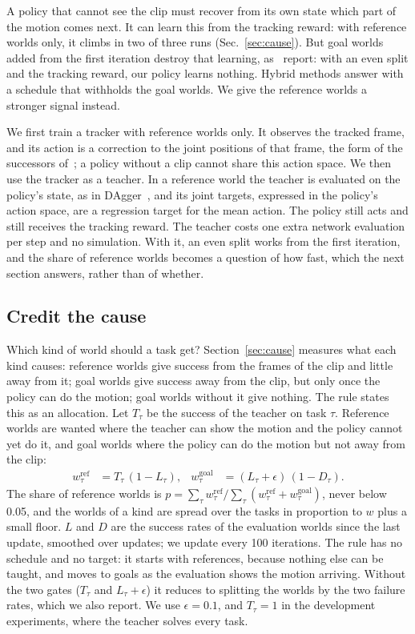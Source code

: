 A policy that cannot see the clip must recover from its own state which part of the motion comes next. It can learn this from the tracking reward: with reference worlds only, it climbs in two of three runs (Sec.~\ref{sec:cause}). But goal worlds added from the first iteration destroy that learning, as~\cite{wang2026generalizing} report: with an even split and the tracking reward, our policy learns nothing. Hybrid methods answer with a schedule that withholds the goal worlds. We give the reference worlds a stronger signal instead.

We first train a tracker with reference worlds only. It observes the tracked frame, and its action is a correction to the joint positions of that frame, the form of the successors of~\cite{deepmimic}; a policy without a clip cannot share this action space. We then use the tracker as a teacher. In a reference world the teacher is evaluated on the policy's state, as in DAgger~\cite{dagger}, and its joint targets, expressed in the policy's action space, are a regression target for the mean action. The policy still acts and still receives the tracking reward. The teacher costs one extra network evaluation per step and no simulation. With it, an even split works from the first iteration, and the share of reference worlds becomes a question of how fast, which the next section answers, rather than of whether.

\subsection{Credit the cause}
\label{sec:rule}

Which kind of world should a task get? Section~\ref{sec:cause} measures what each kind causes: reference worlds give success from the frames of the clip and little away from it; goal worlds give success away from the clip, but only once the policy can do the motion; goal worlds without it give nothing. The rule states this as an allocation. Let $T_\tau$ be the success of the teacher on task $\tau$. Reference worlds are wanted where the teacher can show the motion and the policy cannot yet do it, and goal worlds where the policy can do the motion but not away from the clip:
\begin{align}
w^{\text{ref}}_\tau &= T_\tau\,(1 - L_\tau), &
w^{\text{goal}}_\tau &= (L_\tau + \epsilon)\,(1 - D_\tau).
\end{align}
The share of reference worlds is $p = \sum_\tau w^{\text{ref}}_\tau / \sum_\tau (w^{\text{ref}}_\tau + w^{\text{goal}}_\tau)$, never below 0.05, and the worlds of a kind are spread over the tasks in proportion to $w$ plus a small floor. $L$ and $D$ are the success rates of the evaluation worlds since the last update, smoothed over updates; we update every 100 iterations. The rule has no schedule and no target: it starts with references, because nothing else can be taught, and moves to goals as the evaluation shows the motion arriving. Without the two gates ($T_\tau$ and $L_\tau+\epsilon$) it reduces to splitting the worlds by the two failure rates, which we also report. We use $\epsilon = 0.1$, and $T_\tau = 1$ in the development experiments, where the teacher solves every task.

